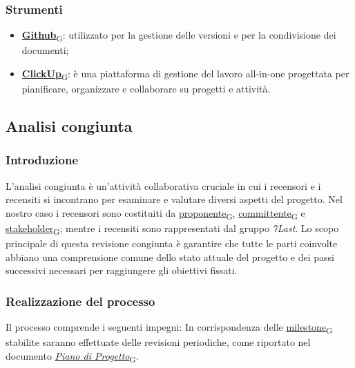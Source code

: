 \subsubsection{Strumenti}

\begin{itemize}
	\item \href{https://7last.github.io/docs/pb/documentazione-interna/glossario\#github}{\textbf{Github}\textsubscript{G}}: utilizzato per la gestione delle versioni e per la condivisione dei documenti;
	\item \href{https://7last.github.io/docs/pb/documentazione-interna/glossario\#clickup}{\textbf{ClickUp}\textsubscript{G}}: è una piattaforma di gestione del lavoro all-in-one progettata per pianificare, organizzare e collaborare su progetti e attività.
\end{itemize}


\subsection{Analisi congiunta}
\subsubsection{Introduzione}
L'analisi congiunta è un'attività collaborativa cruciale in cui i recensori e i recensiti si incontrano per esaminare e valutare diversi aspetti del progetto.  Nel nostro caso i recensori sono costituiti da \href{https://7last.github.io/docs/pb/documentazione-interna/glossario\#proponente}{proponente\textsubscript{G}}, \href{https://7last.github.io/docs/pb/documentazione-interna/glossario\#committente}{committente\textsubscript{G}} e \href{https://7last.github.io/docs/pb/documentazione-interna/glossario\#stakeholder}{stakeholder\textsubscript{G}}; mentre i recensiti sono rappresentati dal gruppo \textit{7Last}. Lo scopo principale di questa revisione congiunta è garantire che tutte le parti coinvolte abbiano una comprensione comune dello stato attuale del progetto e dei passi successivi necessari per raggiungere gli obiettivi fissati.

\subsubsection{Realizzazione del processo}
Il processo comprende i seguenti impegni:
In corrispondenza delle \href{https://7last.github.io/docs/pb/documentazione-interna/glossario\#milestone}{milestone\textsubscript{G}} stabilite saranno effettuate delle revisioni periodiche, come riportato nel
documento \href{https://7last.github.io/docs/pb/documentazione-interna/glossario\#piano-di-progetto}{\textit{Piano di Progetto}\textsubscript{G}}.

